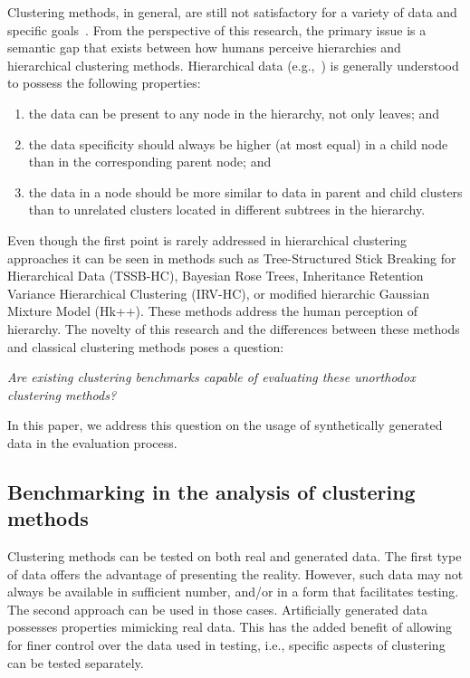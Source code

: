 \documentclass{article}
\begin{document}
Clustering methods, in general, are still not satisfactory for a variety of data and specific goals~\cite{blundell2010discovering}. From the perspective of this research, the primary issue is a semantic gap that exists between how humans perceive hierarchies and hierarchical clustering methods. Hierarchical data (e.g.,~\cite{ILSVRC15}) is generally understood to possess the following properties:
\begin{enumerate}
    \item the data can be present to any node in the hierarchy, not only leaves; and
    \item the data specificity should always be higher (at most equal) in a child node than in the corresponding parent node; and
    \item the data in a node should be more similar to data in parent and child clusters than to unrelated clusters located in different subtrees in the hierarchy.
\end{enumerate}

Even though the first point is rarely addressed in hierarchical clustering approaches it can be seen in methods such as Tree-Structured Stick Breaking for Hierarchical Data (TSSB-HC)\cite{ghahramani2010tree}, Bayesian Rose Trees\cite{2010_bayesian_rose_trees}, Inheritance Retention Variance Hierarchical Clustering (IRV-HC)\cite{Spytkowski2012}, or modified hierarchic Gaussian Mixture Model (Hk++)\cite{Olech2016}. These methods address the human perception of hierarchy. The novelty of this research and the differences between these methods and classical clustering methods poses a question:

\textit{Are existing clustering benchmarks capable of evaluating these unorthodox clustering methods?}

In this paper, we address this question on the usage of synthetically generated data in the evaluation process.

\subsection{Benchmarking in the analysis of clustering methods}

Clustering methods can be tested on both real and generated data. The first type of data offers the advantage of presenting the reality. However, such data may not always be available in sufficient number, and/or in a form that facilitates testing. The second approach can be used in those cases. Artificially generated data possesses properties mimicking real data. This has the added benefit of allowing for finer control over the data used in testing, i.e., specific aspects of clustering can be tested separately.
\end{document}
